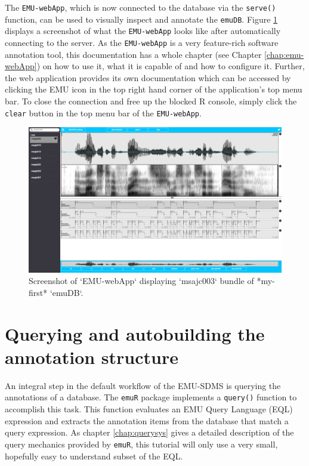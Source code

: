\documentclass[]{book}
\theoremstyle{definition}
\theoremstyle{definition}
\theoremstyle{definition}
\theoremstyle{remark}
\begin{document}
The \texttt{EMU-webApp}, which is now connected to the database via the
\texttt{serve()} function, can be used to visually inspect and annotate
the \texttt{emuDB}. Figure \ref{fig:tutorial-emuWebAppMyFirst} displays
a screenshot of what the \texttt{EMU-webApp} looks like after
automatically connecting to the server. As the \texttt{EMU-webApp} is a
very feature-rich software annotation tool, this documentation has a
whole chapter (see Chapter \ref{chap:emu-webApp}) on how to use it, what
it is capable of and how to configure it. Further, the web application
provides its own documentation which can be accessed by clicking the EMU
icon in the top right hand corner of the application's top menu bar. To
close the connection and free up the blocked R console, simply click the
\texttt{clear} button in the top menu bar of the \texttt{EMU-webApp}.

\begin{figure}

{\centering \includegraphics[width=1\linewidth]{pics/tutorialEmuWebAppMyFirst} 

}

\caption{Screenshot of `EMU-webApp` displaying `msajc003` bundle of *my-first* `emuDB`.}\label{fig:tutorial-emuWebAppMyFirst}
\end{figure}

\hypertarget{querying-and-autobuilding-the-annotation-structure}{%
\section{Querying and autobuilding the annotation
structure}\label{querying-and-autobuilding-the-annotation-structure}}

An integral step in the default workflow of the EMU-SDMS is querying the
annotations of a database. The \texttt{emuR} package implements a
\texttt{query()} function to accomplish this task. This function
evaluates an EMU Query Language (EQL) expression and extracts the
annotation items from the database that match a query expression. As
chapter \ref{chap:querysys} gives a detailed description of the query
mechanics provided by \texttt{emuR}, this tutorial will only use a very
small, hopefully easy to understand subset of the EQL.
\end{document}
